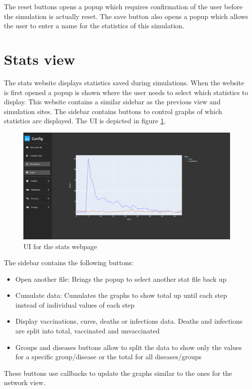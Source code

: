 The reset buttons opens a popup which requires confirmation of the user before the simulation
is actually reset. The save button also opens a popup which allows the user to enter a name
for the statistics of this simulation.

\section{Stats view}
The stats website displays statistics saved during simulations. When the website is first
opened a popup is shown where the user needs to select which statistics to display. This
website contains a similar sidebar as the previous view and simulation sites. The sidebar
contains buttons to control graphs of which statistics are displayed. The UI is depicted in figure
\ref{fig:web_stats_view}.

\begin{figure}
    \centering
    \includegraphics[width=0.5\linewidth]{images/web_stats_view.png}
    \caption{UI for the stats webpage}
    \label{fig:web_stats_view}
\end{figure}

The sidebar contains the following buttons:
\begin{itemize}
    \item Open another file: Brings the popup to select another stat file back up
    \item Cumulate data: Cumulates the graphs to show total up until each step instead of individual values of each step
    \item Display vaccinations, cures, deaths or infections data. Deaths and infections are split
    into total, vaccinated and unvaccinated
    \item Groups and diseases buttons allow to split the data to show only the values for a specific group/disease
    or the total for all diseases/groups
\end{itemize}
These buttons use callbacks to update the graphs similar to the ones for the network view.

